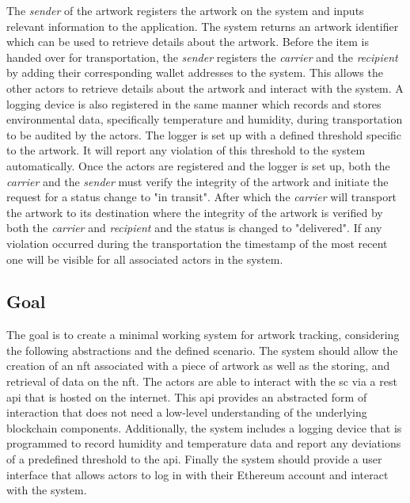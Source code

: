 The \textit{sender} of the artwork registers the artwork on the system and inputs relevant information to the application. The system returns an artwork identifier which can be used to retrieve details about the artwork. Before the item is handed over for transportation, the \textit{sender} registers the \textit{carrier} and the \textit{recipient} by adding their corresponding wallet addresses to the system. This allows the other actors to retrieve details about the artwork and interact with the system. A logging device is also registered in the same manner which records and stores environmental data, specifically temperature and humidity, during transportation to be audited by the actors. The logger is set up with a defined threshold specific to the artwork. It will report any violation of this threshold to the system automatically. Once the actors are registered and the logger is set up, both the \textit{carrier} and the \textit{sender} must verify the integrity of the artwork and initiate the request for a status change to "in transit". After which the \textit{carrier} will transport the artwork to its destination where the integrity of the artwork is verified by both the \textit{carrier} and \textit{recipient} and the status is changed to "delivered". If any violation occurred during the transportation the timestamp of the most recent one will be visible for all associated actors in the system.

\subsection*{Goal}
The goal is to create a minimal working system for artwork tracking, considering the following abstractions and the defined scenario. The system should allow the creation of an \gls{nft} associated with a piece of artwork as well as the storing, and retrieval of data on the \gls{nft}. The actors are able to interact with the \gls{sc} via a \gls{rest} \gls{api} that is hosted on the internet. This \gls{api} provides an abstracted form of interaction that does not need a low-level understanding of the underlying blockchain components. Additionally, the system includes a logging device that is programmed to record humidity and temperature data and report any deviations of a predefined threshold to the \gls{api}. Finally the system should provide a user interface that allows actors to log in with their Ethereum account and interact with the system.

